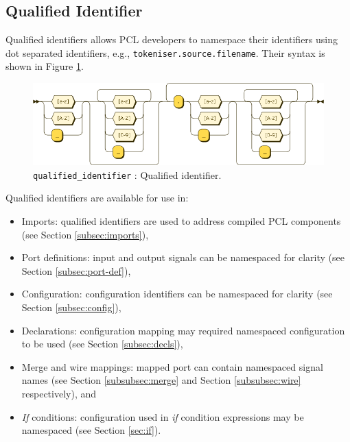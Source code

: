 \subsection{Qualified Identifier}
Qualified identifiers allows PCL developers to namespace their identifiers using dot separated identifiers, e.g., \texttt{tokeniser.source.filename}. Their syntax is shown in Figure \ref{fig:pcl-qualified-id}.
\begin{figure}[h!]
  \centering
    \includegraphics[scale=\DiagramScale,angle=90]{chapters/compiler/diagrams/qualified_identifier}
  \caption{\texttt{qualified\_identifier} : Qualified identifier.}
  \label{fig:pcl-qualified-id}
\end{figure}
Qualified identifiers are available for use in:
\begin{itemize}
\item Imports: qualified identifiers are used to address compiled PCL components (see Section \ref{subsec:imports}),
\item Port definitions: input and output signals can be namespaced for clarity (see Section \ref{subsec:port-def}),
\item Configuration: configuration identifiers can be namespaced for clarity (see Section \ref{subsec:config}),
\item Declarations: configuration mapping may required namespaced configuration to be used (see Section \ref{subsec:decls}),
\item Merge and wire mappings: mapped port can contain namespaced signal names (see Section \ref{subsubsec:merge} and Section \ref{subsubsec:wire} respectively), and
\item \emph{If} conditions: configuration used in \emph{if} condition expressions may be namespaced (see Section \ref{sec:if}).
\end{itemize}

